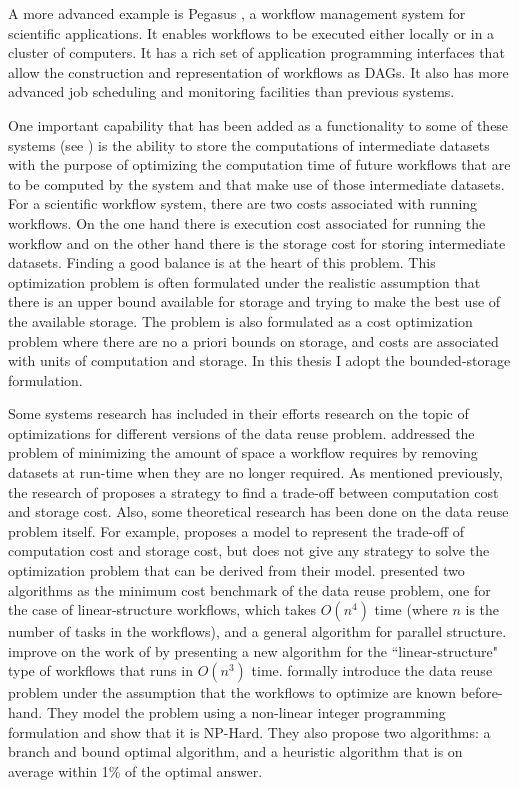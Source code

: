 A more advanced example is Pegasus \citep{singh2008workflow}, a workflow management system for scientific applications.  It enables workflows to be executed either locally or in a cluster of computers.  It has a rich set of application programming interfaces that allow the construction and representation of workflows as DAGs.  It also has more advanced job scheduling and monitoring facilities than previous systems.  

One important capability that has been added as a functionality to some of these systems (see \cite{yuan2012data}) is the ability to store the computations of intermediate datasets with the purpose of optimizing the computation time of future workflows that are to be computed by the system and that make use of those intermediate datasets. For a scientific workflow system, there are two costs associated with running workflows.  On the one hand there is execution cost associated for running the workflow and on the other hand there is the storage cost for storing intermediate datasets.  Finding a good balance is at the heart of this problem.  This optimization problem is often formulated under the realistic assumption that there is an upper bound available for storage and trying to make the best use of the available storage.  The problem is also formulated as a cost optimization problem where there are no a priori bounds on storage, and costs are associated with units of computation and storage.  In this thesis I adopt the bounded-storage formulation.

Some systems research has included in their efforts research on the topic of optimizations for different versions of the data reuse problem.  \cite{ramakrishnan2007scheduling} addressed the problem of minimizing the amount of space a workflow requires by removing datasets at run-time when they are no longer required.  As mentioned previously, the research of \cite{yuan2012data} proposes a strategy to find a trade-off between computation cost and storage cost. Also, some theoretical research has been done on the data reuse problem itself. For example, \cite{adams2009maximizing} proposes a model to represent the trade-off of computation cost and storage cost, but does not give any strategy to solve the optimization problem that can be derived from their model. \cite{yuan2011demand} presented two algorithms as the minimum cost benchmark of the data reuse problem, one for the case of linear-structure workflows, which takes $O(n^4)$ time (where $n$ is the number of tasks in the workflows), and a general algorithm for parallel structure. \cite{cheng2015new} improve on the work of \cite{yuan2011demand} by presenting a new algorithm for the ``linear-structure" type of workflows that runs in $O(n^3)$ time. \cite{zohrevandi2013bounded} formally introduce the data reuse problem under the assumption that the workflows to optimize are known before-hand. They model the problem using a non-linear integer programming formulation and show that  it is NP-Hard.  They also propose two algorithms: a branch and bound optimal algorithm, and a heuristic algorithm that is on average within 1\% of the optimal answer.
